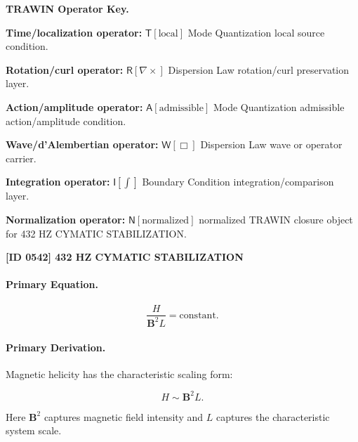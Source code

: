 \par\vspace{0.45\baselineskip}
\noindent\begin{minipage}[t]{\linewidth}
\begingroup
\small
\raggedright
\textbf{TRAWIN Operator Key.}\par
\noindent\textbf{Time/localization operator:} $\mathsf{T}\!\left[\mathrm{local}\right]$ Mode Quantization local source condition.\par
\noindent\textbf{Rotation/curl operator:} $\mathsf{R}\!\left[\nabla\times\right]$ Dispersion Law rotation/curl preservation layer.\par
\noindent\textbf{Action/amplitude operator:} $\mathsf{A}\!\left[\mathrm{admissible}\right]$ Mode Quantization admissible action/amplitude condition.\par
\noindent\textbf{Wave/d'Alembertian operator:} $\mathsf{W}\!\left[\Box\right]$ Dispersion Law wave or operator carrier.\par
\noindent\textbf{Integration operator:} $\mathsf{I}\!\left[\int\right]$ Boundary Condition integration/comparison layer.\par
\noindent\textbf{Normalization operator:} $\mathsf{N}\!\left[\mathrm{normalized}\right]$ normalized TRAWIN closure object for 432 HZ CYMATIC STABILIZATION.\par
\endgroup
\end{minipage}

\clearpage
\noindent\textbf{[ID 0542] 432 HZ CYMATIC STABILIZATION}\par
\vspace{0.35em}
\paragraph{Primary Equation.}
\begin{equation}
\frac{H}{\mathbf{B}^2 L}
=
\mathrm{constant}.
\end{equation}

\paragraph{Primary Derivation.}
Magnetic helicity has the characteristic scaling form:

\begin{equation}
H
\sim
\mathbf{B}^2 L .
\end{equation}

Here $\mathbf{B}^2$ captures magnetic field intensity and $L$ captures the characteristic system scale.

